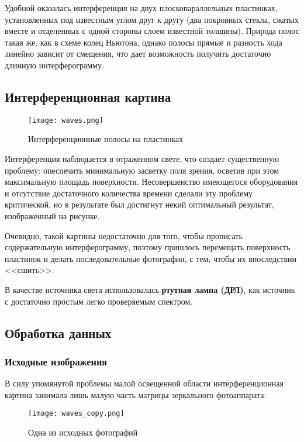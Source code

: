 \documentclass{urticle}
\begin{document}
	Удобной оказалась интерференция на двух плоскопараллельных пластинках, установленных под известным углом друг к другу (два покровных стекла, сжатых вместе и отделенных с одной стороны слоем известной толщины). Природа полос такая же, как в схеме колец Ньютона, однако полосы прямые и разность хода линейно зависит от смещения, что дает возможность получить достаточно длинную интерферограмму.
	
	\subsection*{Интерференционная картина}
	
	\begin{figure}[H]
		\centering
  		\texttt{[image: waves.png]}
  		\caption{Интерференционные полосы на пластинках}
	\end{figure}
	
	Интерференция наблюдается в отраженном свете, что создает существенную проблему: опеспечить минимальную засветку поля зрения, осветив при этом максимальную площадь поверхности. Несовершенство имеющегося оборудования и отсутствие достаточного количества времени сделали эту проблему критической, но в результате был достигнут некий оптимальный результат, изображенный на рисунке.
	
	Очевидно, такой картины недостаточно для того, чтобы прописать содержательную интерферограмму, поэтому пришлось перемещать поверхность пластинок и делать последовательные фотографии, с тем, чтобы их впоследствии <<сшить>>. 
	
	В качестве источника света использовалась \textbf{ртутная лампа (ДРЛ)}, как источник с достаточно простым легко проверяемым спектром.

\newpage
	\subsection*{Обработка данных}
	
	\subsubsection*{Исходные изображения}
	В силу упомянутой проблемы малой освещенной области интерференционная картина занимала лишь малую часть матрицы зеркального фотоаппарата:
	\begin{figure}[H]
	\centering
  	\texttt{[image: waves\_copy.png]}
  \caption{Одна из исходных фотографий}
  \end{figure}
  
\end{document}

